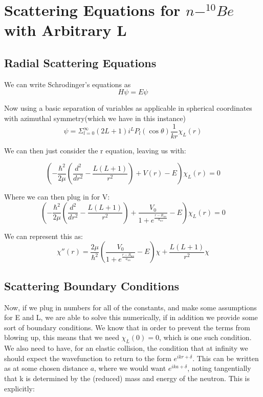\documentclass[11pt]{article} %
\begin{document}
\section{Scattering Equations for  $n-^{10}Be $ with Arbitrary L}


\subsection{Radial Scattering Equations}
We can write Schrodinger's equations as 
\begin{equation}
H\psi=E\psi
\end{equation}

Now using a basic separation of variables as applicable in spherical coordinates with azimuthal symmetry(which we have in this instance)\\

\begin{equation}
\psi=\Sigma_{l=0}^\infty (2L+1)i^LP_l(\cos\theta)\frac{1}{kr}\chi_L(r)
\end{equation}

We can then just consider the r equation, leaving us with:

\begin{equation}
(-\frac{\hbar^2}{2\mu}(\frac{d^2}{dr^2}-\frac{L(L+1)}{r^2})+V(r)-E)\chi_L(r)=0
\end{equation}

Where we can then plug in for V:\\
\begin{equation}
\left(-\frac{\hbar^2}{2\mu}\left(\frac{d^2}{dr^2}-\frac{L(L+1)}{r^2}\right)+\frac{V_0}{1+e^{\frac{r-R_{ws}}{a_{ws}}}}-E\right)\chi_L(r)=0
\end{equation}

We can represent this as:\\

\begin{equation}
\boxed{\chi''(r)=\frac{2\mu}{\hbar^2}\left(\frac{V_0}{1+e^{\frac{r-R_{ws}}{a_{ws}}}}-E\right)\chi+\frac{L(L+1)}{r^2}\chi}
\end{equation}
\subsection{Scattering Boundary Conditions}
Now, if we plug in numbers for all of the constants, and make some assumptions for E and L, we are able to solve this numerically, if in addition we provide some sort of boundary conditions. We know that in order to prevent the terms from blowing up, this means that we need $\chi_L(0)=0$, which is one such condition. We also need to have, for an elastic collision, the condition that at infinity we should expect the wavefunction to return to the form $e^{ikr+\delta}$. This can be written as at some chosen distance $a$, where we would want $e^{ika+\delta}$, noting tangentially that k is determined by the (reduced) mass and energy of the neutron. This is explicitly:\\
\end{document}
